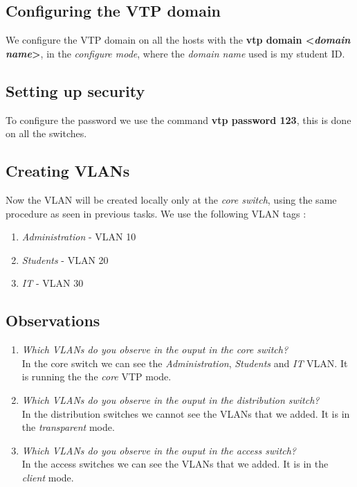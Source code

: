 \documentclass{article}
\begin{document}
\subsection{Configuring the VTP domain}

We configure the VTP domain on all the hosts with the \textbf{vtp domain \textless \textit{domain name}\textgreater}, in the \textit{configure mode}, where the \textit{domain name} used is my student ID. 

\subsection{Setting up security}
To configure the password we use the command \textbf{vtp password 123}, this is done on all the switches. 

\subsection{Creating VLANs}

Now the VLAN will be created locally only at the \textit{core switch}, using the same procedure as seen in previous tasks. We use the following VLAN tags : 
\begin{enumerate}
    \item \textit{Administration} - VLAN 10 
    \item \textit{Students} - VLAN 20
    \item \textit{IT} - VLAN 30
\end{enumerate}

\subsection{Observations}

\begin{enumerate}
    \item \textit{Which VLANs do you observe in the ouput in the core switch?}\\
    In the core switch we can see the \textit{Administration}, \textit{Students} and \textit{IT} VLAN. It is running the the \textit{core} VTP mode.
    
    \item \textit{Which VLANs do you observe in the ouput in the distribution switch?}\\
        In the distribution switches we cannot see the VLANs that we added. It is in the \textit{transparent} mode. 
        
    \item \textit{Which VLANs do you observe in the ouput in the access switch?}\\
        In the access switches we can  see the VLANs that we added. It is in the \textit{client} mode. 
\end{enumerate}   
\end{document}

